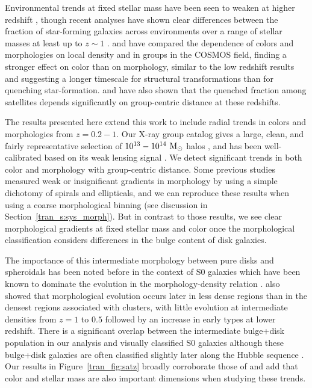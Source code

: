 Environmental trends at fixed stellar mass have been seen to weaken at
higher redshift \citep[e.g.,][]{Poggianti2008, Tasca2009,
  Cucciati2010, Iovino2010, Kovac2010b}, though recent analyses have
shown clear differences between the fraction of star-forming galaxies
across environments over a range of stellar masses at least up to $z\sim1$
\citep{Cooper2010, Peng2010, George2011, Knobel2012}. \citet{Tasca2009} and
\citet{Kovac2010b} have compared the dependence of colors and
morphologies on local density and in groups in the COSMOS field,
finding a stronger effect on color than on morphology, similar to the
low redshift results and suggesting a longer timescale for structural
transformations than for quenching star-formation. \citet{Muzzin2012}
and \citet{Presotto2012} have also shown that the quenched fraction
among satellites depends significantly on group-centric distance at
these redshifts.

The results presented here extend this work to include radial trends
in colors and morphologies from $z=0.2-1$. Our X-ray group catalog
gives a large, clean, and fairly representative selection of
$10^{13}-10^{14}~{\rm M_{\odot}}$ halos \citep{Finoguenov2010}, and
has been well-calibrated based on 
its weak lensing signal \citep{Leauthaud2010, George2012}. We detect significant
trends in both color and morphology with group-centric distance. Some previous studies measured weak or insignificant
gradients in morphology by using a simple dichotomy of spirals and
ellipticals, and we can reproduce these results when using a coarse
morphological binning (see discussion in Section~\ref{tran_s:sys_morph}). But in contrast
to those results, we see clear morphological gradients at
fixed stellar mass and color once the morphological classification
considers differences in the bulge content of disk galaxies.

The importance of this intermediate morphology between pure disks and
spheroidals has been noted before in the context of S0 galaxies which
have been known to dominate the evolution in the morphology-density
relation \citep{Dressler1997, Postman2005, Smith2005a, Boselli2006b,
  Moran2007, Oesch2010, Lackner2013}.
\citet{Smith2005a} also showed that morphological evolution occurs
later in less dense regions than in the densest regions associated
with clusters, with little evolution at intermediate densities from
$z=1$ to $0.5$ followed by an increase in early types at lower
redshift. There is a significant overlap between the intermediate
bulge+disk population in our analysis and visually classified S0
galaxies although these bulge+disk galaxies are often classified
slightly later along the Hubble sequence \citep{Scarlata2007}. Our
results in Figure~\ref{tran_fig:satz} broadly corroborate those of
\citet{Smith2005a} and add that color and stellar mass are also
important dimensions when studying these trends.

